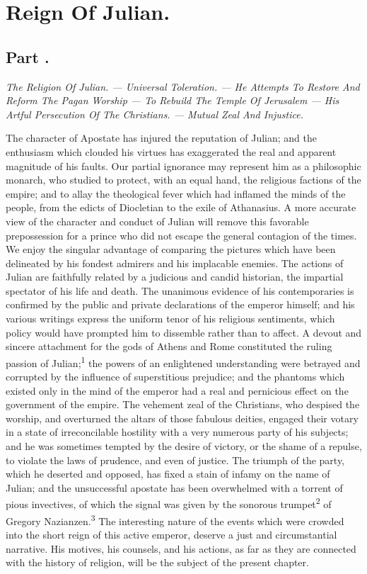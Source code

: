 \chapter{Reign Of Julian.}
\section{Part \thesection.}

\textit{The Religion Of Julian. — Universal Toleration. — He Attempts To
Restore And Reform The Pagan Worship — To Rebuild The Temple Of
Jerusalem — His Artful Persecution Of The Christians. — Mutual Zeal
And Injustice.}
\vspace{\onelineskip}

The character of Apostate has injured the reputation of Julian;
and the enthusiasm which clouded his virtues has exaggerated the
real and apparent magnitude of his faults. Our partial ignorance
may represent him as a philosophic monarch, who studied to
protect, with an equal hand, the religious factions of the
empire; and to allay the theological fever which had inflamed the
minds of the people, from the edicts of Diocletian to the exile
of Athanasius. A more accurate view of the character and conduct
of Julian will remove this favorable prepossession for a prince
who did not escape the general contagion of the times. We enjoy
the singular advantage of comparing the pictures which have been
delineated by his fondest admirers and his implacable enemies.
The actions of Julian are faithfully related by a judicious and
candid historian, the impartial spectator of his life and death.
The unanimous evidence of his contemporaries is confirmed by the
public and private declarations of the emperor himself; and his
various writings express the uniform tenor of his religious
sentiments, which policy would have prompted him to dissemble
rather than to affect. A devout and sincere attachment for the
gods of Athens and Rome constituted the ruling passion of Julian;\textsuperscript{1}
the powers of an enlightened understanding were betrayed and
corrupted by the influence of superstitious prejudice; and the
phantoms which existed only in the mind of the emperor had a real
and pernicious effect on the government of the empire. The
vehement zeal of the Christians, who despised the worship, and
overturned the altars of those fabulous deities, engaged their
votary in a state of irreconcilable hostility with a very
numerous party of his subjects; and he was sometimes tempted by
the desire of victory, or the shame of a repulse, to violate the
laws of prudence, and even of justice. The triumph of the party,
which he deserted and opposed, has fixed a stain of infamy on the
name of Julian; and the unsuccessful apostate has been
overwhelmed with a torrent of pious invectives, of which the
signal was given by the sonorous trumpet\textsuperscript{2} of Gregory Nazianzen.\textsuperscript{3}
The interesting nature of the events which were crowded into
the short reign of this active emperor, deserve a just and
circumstantial narrative. His motives, his counsels, and his
actions, as far as they are connected with the history of
religion, will be the subject of the present chapter.

